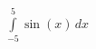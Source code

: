 \documentclass[preview]{standalone}
\begin{document}
\begin{align*}
\int\limits_{-5}^{5} \sin{\left(x \right)}\, dx
\end{align*}
\end{document}

